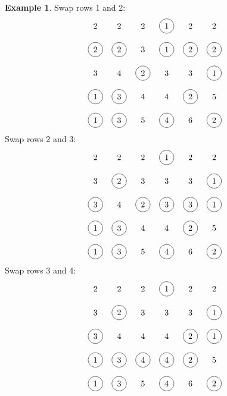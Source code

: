 \documentclass[reqno]{amsart}
\newcommand{\0}{\phantom{c}}
\theoremstyle{plain}
\theoremstyle{definition}
\newtheorem{example}[thm]{Example}
\numberwithin{equation}{section}
\begin{document}
\begin{example}
\noindent Swap rows 1 and 2:
\[
\begin{tikzpicture}\node at (0, 5){2};\node at (1, 5){2};\node at (2, 5){2};\node[circle, draw=black] at (3, 5){1};\node at (4, 5){2};\node at (5, 5){2};\node[circle, draw=black] at (0, 4){2};\node[circle, draw=black] at (1, 4){2};\node at (2, 4){3};\node[circle, draw=black] at (3, 4){1};\node[circle, draw=black] at (4, 4){2};\node[circle, draw=black] at (5, 4){2};\node at (0, 3){3};\node at (1, 3){4};\node[circle, draw=black] at (2, 3){2};\node at (3, 3){3};\node at (4, 3){3};\node[circle, draw=black] at (5, 3){1};\node[circle, draw=black] at (0, 2){1};\node[circle, draw=black] at (1, 2){3};\node at (2, 2){4};\node at (3, 2){4};\node[circle, draw=black] at (4, 2){2};\node at (5, 2){5};\node[circle, draw=black] at (0, 1){1};\node[circle, draw=black] at (1, 1){3};\node at (2, 1){5};\node[circle, draw=black] at (3, 1){4};\node at (4, 1){6};\node[circle, draw=black] at (5, 1){2};\end{tikzpicture}
\]
Swap rows 2 and 3:
\[
\begin{tikzpicture}\node at (0, 5){2};\node at (1, 5){2};\node at (2, 5){2};\node[circle, draw=black] at (3, 5){1};\node at (4, 5){2};\node at (5, 5){2};\node at (0, 4){3};\node[circle, draw=black] at (1, 4){2};\node at (2, 4){3};\node at (3, 4){3};\node at (4, 4){3};\node[circle, draw=black] at (5, 4){1};\node[circle, draw=black] at (0, 3){3};\node at (1, 3){4};\node[circle, draw=black] at (2, 3){2};\node[circle, draw=black] at (3, 3){3};\node[circle, draw=black] at (4, 3){3};\node[circle, draw=black] at (5, 3){1};\node[circle, draw=black] at (0, 2){1};\node[circle, draw=black] at (1, 2){3};\node at (2, 2){4};\node at (3, 2){4};\node[circle, draw=black] at (4, 2){2};\node at (5, 2){5};\node[circle, draw=black] at (0, 1){1};\node[circle, draw=black] at (1, 1){3};\node at (2, 1){5};\node[circle, draw=black] at (3, 1){4};\node at (4, 1){6};\node[circle, draw=black] at (5, 1){2};\end{tikzpicture}
\]
Swap rows 3 and 4:
\[
\begin{tikzpicture}\node at (0, 5){2};\node at (1, 5){2};\node at (2, 5){2};\node[circle, draw=black] at (3, 5){1};\node at (4, 5){2};\node at (5, 5){2};\node at (0, 4){3};\node[circle, draw=black] at (1, 4){2};\node at (2, 4){3};\node at (3, 4){3};\node at (4, 4){3};\node[circle, draw=black] at (5, 4){1};\node[circle, draw=black] at (0, 3){3};\node at (1, 3){4};\node at (2, 3){4};\node at (3, 3){4};\node[circle, draw=black] at (4, 3){2};\node[circle, draw=black] at (5, 3){1};\node[circle, draw=black] at (0, 2){1};\node[circle, draw=black] at (1, 2){3};\node[circle, draw=black] at (2, 2){4};\node[circle, draw=black] at (3, 2){4};\node[circle, draw=black] at (4, 2){2};\node at (5, 2){5};\node[circle, draw=black] at (0, 1){1};\node[circle, draw=black] at (1, 1){3};\node at (2, 1){5};\node[circle, draw=black] at (3, 1){4};\node at (4, 1){6};\node[circle, draw=black] at (5, 1){2};\end{tikzpicture}
\]
\end{example}
\end{document}
